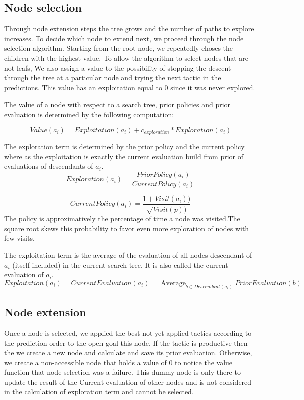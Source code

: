 \documentclass[runningheads,a4paper,draft]{svjour3}
\DeclareMathOperator*{\average}{Average}
\begin{document}
\subsection{Node selection}


Through node extension steps the tree grows and  the number of paths to explore 
increases. To decide which node to extend next, we proceed through the node 
selection algorithm. Starting from the root node, we repeatedly choses the 
children with the highest value. To allow the algorithm to select nodes that 
are not leafs, We also assign a value to the possibility of stopping the 
descent through the tree at a particular node and trying the next tactic in the 
predictions. This value has an exploitation equal to 0 since it was never 
explored. 


The value of a node with respect to a search tree, prior policies and prior 
evaluation is determined by the 
following computation:

\[Value(a_i) = Exploitation(a_i) + c_{exploration} * Exploration(a_i)\] 

The exploration term is determined by the prior policy and the current policy 
where as the exploitation is exactly the current evaluation build from prior of 
evaluations of descendants of $a_i$.
\[Exploration(a_i) = \frac{PriorPolicy(a_i)}{CurrentPolicy(a_i)}\]

\[CurrentPolicy(a_i) = \frac{1 + Visit(a_i))}{\sqrt{Visit(p))}}\]
The policy is approximatively the  percentage of time a node was visited.The 
square root skews this probability to favor even more exploration of nodes with 
few visits. 

The exploitation term is the average of the evaluation of 
all nodes descendant of $a_i$ (itself included) in the current search tree. It 
is also called the current evaluation of $a_i$.   
\[Exploitation(a_i) = CurrentEvaluation(a_i) = 
  \average_{b \in Descendant(a_i)} {PriorEvaluation(b)}\]

\subsection{Node extension}
Once a node is selected, we applied the best not-yet-applied tactics according 
to the prediction order to the open goal this node. If the tactic is productive 
then the we create a new 
node and calculate and save its prior evaluation. Otherwise, we create a 
non-accessible node that holds a value of 0 to notice the value function that 
node selection was a failure. This dummy node is only there to update the 
result of the Current evaluation of other nodes and is not considered in the 
calculation of exploration term and cannot be selected.
\end{document}
